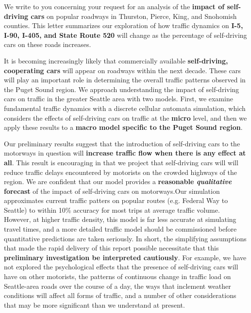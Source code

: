 \documentclass[12pt,stdletter,orderfromtodate,sigleft]{newlfm}
\begin{document}
\begin{newlfm}

We write to you concerning your request for an analysis of the \textbf{impact of self-driving cars} on popular roadways in Thurston, Pierce, King, and Snohomish counties. This letter summarizes our exploration of how traffic dynamics on \textbf{I-5, I-90, I-405, and State Route 520} will change as the percentage of self-driving cars on these roads increases. 

It is becoming increasingly likely that commercially available \textbf{self-driving, cooperating cars} will appear on roadways within the next decade.  These cars will play an important role in determining the overall traffic patterns observed in the Puget Sound region.  We approach understanding the impact of self-driving cars on traffic in the greater Seattle area with two models.  First, we examine fundamental traffic dynamics with a discrete cellular automata simulation, which considers the effects of self-driving cars on traffic at the \textbf{micro} level, and then we apply these results to a \textbf{macro model specific to the Puget Sound region}. 

Our preliminary results suggest that the introduction of self-driving cars to the motorways in question will \textbf{increase traffic flow when there is any effect at all}.  This result is encouraging in that we project that self-driving cars will will reduce traffic delays encountered by motorists on the crowded highways of the region.  We are confident that our model provides a \textbf{reasonable \textit{qualitative} forecast} of the impact of self-driving cars on motorways.Our simulation approximates current traffic patters on popular routes (e.g. Federal Way to Seattle) to within 10\% accuracy for most trips at average traffic volume.  However, at higher traffic density, this model is far less accurate at simulating travel times, and a more detailed traffic model should be commissioned before quantitative predictions are taken seriously.  In short, the simplifying assumptions that made the rapid delivery of this report possible necessitate that this \textbf{preliminary investigation be interpreted cautiously}.  For example, we have not explored the psychological effects that the presence of self-driving cars will have on other motorists, the patterns of continuous change in traffic load on Seattle-area roads over the course of a day, the ways that inclement weather conditions will affect all forms of traffic, and a number of other considerations that may be more significant than we understand at present.


\end{newlfm}
\end{document}
